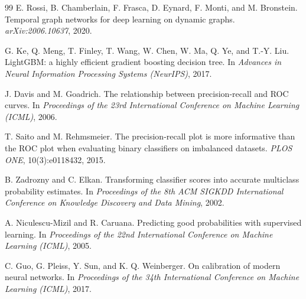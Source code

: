 \documentclass[11pt]{article}
\theoremstyle{definition}
\theoremstyle{remark}
\begin{document}
\begin{thebibliography}{99}
E. Rossi, B. Chamberlain, F. Frasca, D. Eynard, F. Monti, and M. Bronstein.
Temporal graph networks for deep learning on dynamic graphs.
\emph{arXiv:2006.10637}, 2020.

G. Ke, Q. Meng, T. Finley, T. Wang, W. Chen, W. Ma, Q. Ye, and T.-Y. Liu.
LightGBM: a highly efficient gradient boosting decision tree.
In \emph{Advances in Neural Information Processing Systems (NeurIPS)}, 2017.

J. Davis and M. Goadrich.
The relationship between precision-recall and ROC curves.
In \emph{Proceedings of the 23rd International Conference on Machine Learning (ICML)}, 2006.

T. Saito and M. Rehmsmeier.
The precision-recall plot is more informative than the ROC plot when evaluating binary classifiers on imbalanced datasets.
\emph{PLOS ONE}, 10(3):e0118432, 2015.

B. Zadrozny and C. Elkan.
Transforming classifier scores into accurate multiclass probability estimates.
In \emph{Proceedings of the 8th ACM SIGKDD International Conference on Knowledge Discovery and Data Mining}, 2002.

A. Niculescu-Mizil and R. Caruana.
Predicting good probabilities with supervised learning.
In \emph{Proceedings of the 22nd International Conference on Machine Learning (ICML)}, 2005.

C. Guo, G. Pleiss, Y. Sun, and K. Q. Weinberger.
On calibration of modern neural networks.
In \emph{Proceedings of the 34th International Conference on Machine Learning (ICML)}, 2017.

\end{thebibliography}
\end{document}
